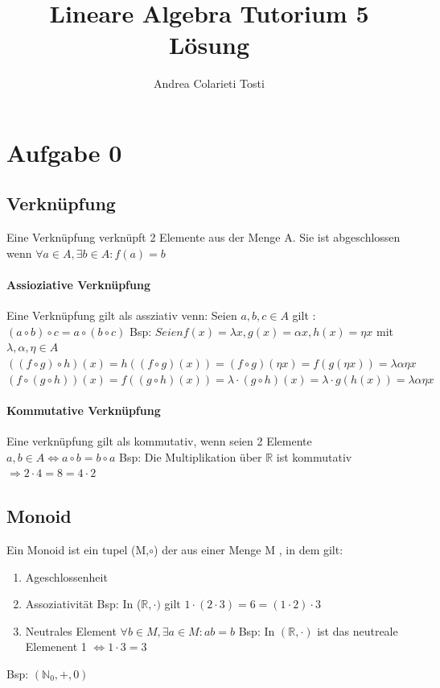 \documentclass[10pt,a4paper]{article}
\author{Andrea Colarieti Tosti}
\title{Lineare Algebra Tutorium 5 Lösung}
\begin{document}
\maketitle
\newpage

\section{Aufgabe 0}
\subsection{Verknüpfung}
Eine Verknüpfung verknüpft 2 Elemente aus der Menge A.
Sie ist abgeschlossen wenn $\forall a \in A, \exists b \in A : f(a) = b$
\paragraph{Assioziative Verknüpfung} Eine Verknüpfung gilt als assziativ venn:\newline
Seien $a,b,c \in A $ gilt : $ (a \circ b) \circ c = a \circ (b \circ c)$\newline\newline
Bsp: $ Seien f(x) = \lambda x , g(x) = \alpha x , h(x)= \eta x$ mit $\lambda,\alpha,\eta \in A $\newline\newline
$((f \circ g)\circ h)(x)= h((f\circ g)(x)) = (f \circ g) (\eta x) = f(g(\eta x)) = \lambda \alpha \eta x $
\newline\newline
$ (f\circ (g\circ h))(x) = f((g\circ h)(x)) = \lambda\cdot (g\circ h)(x)= \lambda\cdot g(h(x))= \lambda \alpha \eta x $
\paragraph{Kommutative Verknüpfung} Eine verknüpfung gilt als kommutativ, wenn seien 2 Elemente $a,b \in A \Leftrightarrow a \circ b = b \circ a$\newline
Bsp: Die Multiplikation über $\mathbb{R}$ ist kommutativ $\Rightarrow 2 \cdot 4 = 8 = 4 \cdot 2$

\subsection{Monoid}
Ein Monoid ist ein tupel (M,$\circ$) der aus einer Menge M , in dem gilt:
\begin{enumerate}
\item Ageschlossenheit
\item Assoziativität\newline
Bsp: In ($\mathbb{R},\cdot)$ gilt $1 \cdot (2 \cdot 3) = 6 = (1 \cdot 2) \cdot 3 $
\item Neutrales Element \newline
$ \forall b \in M, \exists a \in M : ab = b$\newline
Bsp: In $(\mathbb{R},\cdot)$ ist das neutreale Elemenent 1 $ \Leftrightarrow 1\cdot 3 = 3$ 
\end{enumerate}
Bsp: $ { (\mathbb {N} _{0},+,0)} $ 
\end{document}
